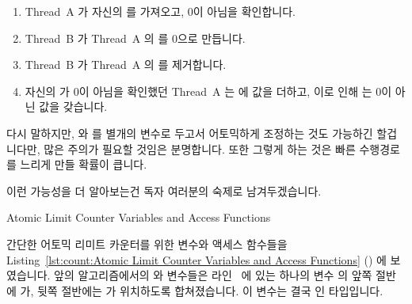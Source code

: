 \begin{lineref}
{	\begin{enumerate}
	\item	Thread~A 가 자신의 를 가져오고, 0이 아님을
		확인합니다.
	\item	Thread~B 가 Thread~A 의  를 0으로 만듭니다.
	\item	Thread~B 가 Thread~A 의 를 제거합니다.
	\item	자신의  가 0이 아님을 확인했던 Thread~A 는
		 에 값을 더하고, 이로 인해  는 0이 아닌
		값을 갖습니다.
	\end{enumerate}

	다시 말하지만,  와  를 별개의 변수로 두고서
	어토믹하게 조정하는 것도 가능하긴 할겁니다만, 많은 주의가 필요할 것임은
	분명합니다.
	또한 그렇게 하는 것은 빠른 수행경로를 느리게 만들 확률이 큽니다.

	이런 가능성을 더 알아보는건 독자 여러분의 숙제로 남겨두겠습니다.

} \QuickQuizEnd

\begin{listing}[tbp]

\caption{Atomic Limit Counter Variables and Access Functions}
\label{lst:count:Atomic Limit Counter Variables and Access Functions}
\end{listing}

\begin{lineref}
간단한 어토믹 리미트 카운터를 위한 변수와 액세스 함수들을
Listing~\ref{lst:count:Atomic Limit Counter Variables and Access Functions}
() 에 보였습니다.
앞의 알고리즘에서의  와  변수들은
라인~ 에 있는 하나의 변수  의 앞쪽 절반에
 가, 뒷쪽 절반에는  가 위치하도록 합쳐졌습니다.
이 변수는 결국  인  타입입니다.


\end{lineref}
\end{lineref}
